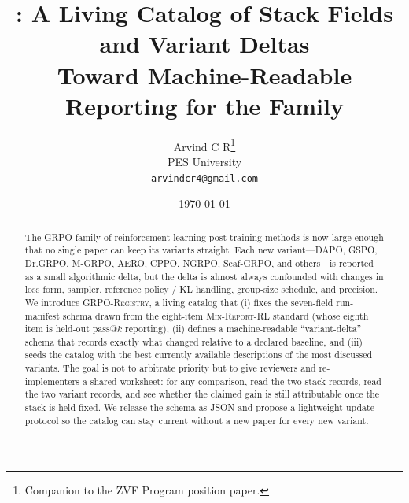 \documentclass[11pt]{article}
\title{\grpoReg{}: A Living Catalog of Stack Fields and Variant Deltas\\
\large Toward Machine-Readable Reporting for the \grpo{} Family}
\author{Arvind C R\thanks{Companion to the ZVF Program \minreport{} position
paper.}\\PES University\\\texttt{arvindcr4@gmail.com}}
\date{\today}
\newcommand{\minreport}{\textsc{Min-Report-RL}}
\newcommand{\grpo}{\textsc{GRPO}}
\newcommand{\grpoReg}{\textsc{GRPO-Registry}}
\begin{document}
\maketitle

\begin{abstract}
The \grpo{} family of reinforcement-learning post-training methods is now
large enough that no single paper can keep its variants straight. Each new
variant---DAPO, GSPO, Dr.\grpo{}, M-\grpo{}, AERO, CPPO, NGRPO,
Scaf-\grpo{}, and others---is reported as a small algorithmic delta, but the
delta is almost always confounded with changes in loss form, sampler, reference
policy / KL handling, group-size schedule, and precision. We introduce
\grpoReg{}, a living catalog that (i) fixes the seven-field run-manifest
schema drawn from the eight-item \minreport{} standard (whose eighth item is
held-out pass@$k$ reporting), (ii)
defines a machine-readable ``variant-delta'' schema that records exactly what
changed relative to a declared baseline, and (iii) seeds the catalog with the
best currently available descriptions of the most discussed variants. The goal
is not to arbitrate priority but to give reviewers and re-implementers a shared
worksheet: for any comparison, read the two stack records, read the two variant
records, and see whether the claimed gain is still attributable once the stack
is held fixed. We release the schema as JSON and propose a lightweight
update protocol so the catalog can stay current without a new paper for every
new variant.
\end{abstract}
\end{document}
